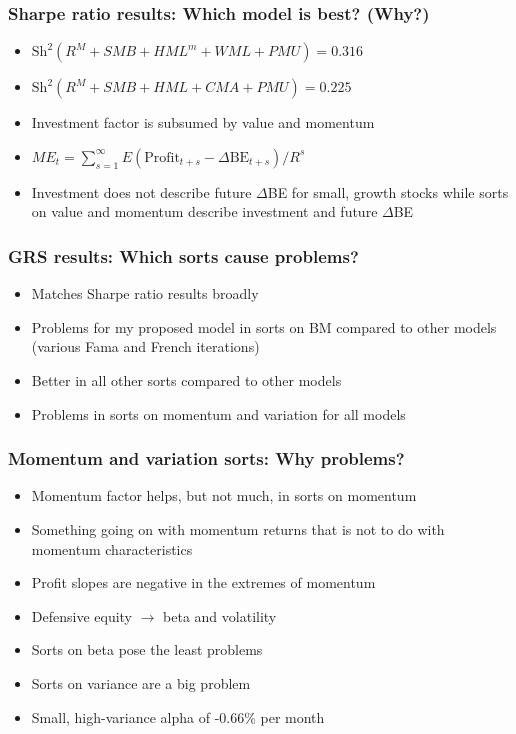 \documentclass{beamer}
\begin{document}
\begin{frame}
\frametitle{Sharpe ratio results: Which model is best? (Why?)}
\begin{itemize}
    \item<1-> $\text{Sh}^2(R^M + SMB + HML^m + WML + PMU)=0.316$
    \item<1-> $\text{Sh}^2(R^M + SMB + HML   + CMA + PMU)=0.225$
    \item<2-> Investment factor is subsumed by value and momentum
    \item<3-> $ME_t = \sum_{s=1}^\infty E\left( \text{Profit}_{t+s} - \Delta\text{BE}_{t+s}\right) /R^s$
    \item<3-> Investment does not describe future $\Delta$BE for small, growth
    stocks while sorts on value and momentum describe investment and future
    $\Delta$BE
\end{itemize}
\end{frame}

\begin{frame}
\frametitle{GRS results: Which sorts cause problems?}
\begin{itemize}
    \item<1-> Matches Sharpe ratio results broadly
    \item<2-> Problems for my proposed model in sorts on BM compared to other
    models (various Fama and French iterations)
    \item<2-> Better in all other sorts compared to other models
    \item<3-> Problems in sorts on momentum and variation for all models
\end{itemize}
\end{frame}

\begin{frame}
\frametitle{Momentum and variation sorts: Why problems?}
\begin{itemize}
    \item<1-> Momentum factor helps, but not much, in sorts on momentum
    \item<1-> Something going on with momentum returns that is not to do with
    momentum characteristics
    \item<2-> Profit slopes are negative in the extremes of momentum
    \item<2-> Defensive equity $\rightarrow$ beta and volatility
    \item<3-> Sorts on beta pose the least problems
    \item<4-> Sorts on variance are a big problem
    \item<4-> Small, high-variance alpha of -0.66\% per month
\end{itemize}
\end{frame}
\end{document}
